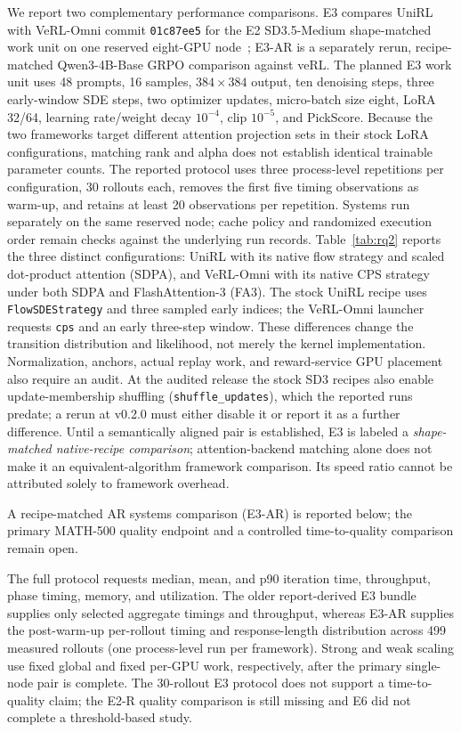 \documentclass[10pt]{article}
\begin{document}
We report two complementary performance comparisons.
E3 compares UniRL with VeRL-Omni commit \texttt{01c87ee5} for the E2 SD3.5-Medium shape-matched work unit on one reserved eight-GPU node~\citep{verlomni2026}; E3-AR is a separately rerun, recipe-matched Qwen3-4B-Base GRPO comparison against veRL.
The planned E3 work unit uses 48 prompts, 16 samples, $384\times384$ output, ten denoising steps, three early-window SDE steps, two optimizer updates, micro-batch size eight, LoRA 32/64, learning rate/weight decay $10^{-4}$, clip $10^{-5}$, and PickScore.
Because the two frameworks target different attention projection sets in their stock LoRA configurations, matching rank and alpha does not establish identical trainable parameter counts.
The reported protocol uses three process-level repetitions per configuration, 30 rollouts each, removes the first five timing observations as warm-up, and retains at least 20 observations per repetition.
Systems run separately on the same reserved node; cache policy and randomized execution order remain checks against the underlying run records.
Table~\ref{tab:rq2} reports the three distinct configurations: UniRL with its native flow strategy and scaled dot-product attention (SDPA), and VeRL-Omni with its native CPS strategy under both SDPA and FlashAttention-3 (FA3).
The stock UniRL recipe uses \texttt{FlowSDEStrategy} and three sampled early indices; the VeRL-Omni launcher requests \texttt{cps} and an early three-step window.
These differences change the transition distribution and likelihood, not merely the kernel implementation. Normalization, anchors, actual replay work, and reward-service GPU placement also require an audit.
At the audited release the stock SD3 recipes also enable update-membership shuffling (\texttt{shuffle\_updates}), which the reported runs predate; a rerun at v0.2.0 must either disable it or report it as a further difference.
Until a semantically aligned pair is established, E3 is labeled a \emph{shape-matched native-recipe comparison}; attention-backend matching alone does not make it an equivalent-algorithm framework comparison.
Its speed ratio cannot be attributed solely to framework overhead.

A recipe-matched AR systems comparison (E3-AR) is reported below; the primary MATH-500 quality endpoint and a controlled time-to-quality comparison remain open.

The full protocol requests median, mean, and p90 iteration time, throughput, phase timing, memory, and utilization.
The older report-derived E3 bundle supplies only selected aggregate timings and throughput, whereas E3-AR supplies the post-warm-up per-rollout timing and response-length distribution across 499 measured rollouts (one process-level run per framework).
Strong and weak scaling use fixed global and fixed per-GPU work, respectively, after the primary single-node pair is complete.
The 30-rollout E3 protocol does not support a time-to-quality claim; the E2-R quality comparison is still missing and E6 did not complete a threshold-based study.
\end{document}
